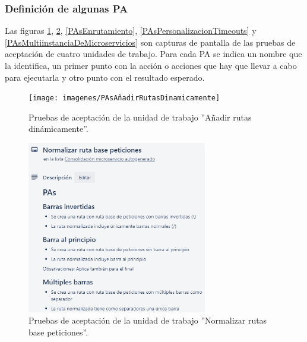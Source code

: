 \documentclass[11pt,spanish,listoffigures]{tfgetsinf}
\begin{document}

			\subsubsection{Definición de algunas PA}

Las figuras \ref{PAsAñadirRutasDinamicamente}, \ref{PAsNormalizarRutaBasePeticiones}, \ref{PAsEnrutamiento}, \ref{PAsPersonalizacionTimeouts} y \ref{PAsMultiinstanciaDeMicroservicios} son capturas de pantalla de las pruebas de aceptación de cuatro unidades de trabajo. Para cada PA se indica un nombre que la identifica, un primer punto con la acción o acciones que hay que llevar a cabo para ejecutarla y otro punto con el resultado esperado.

\begin{figure}[H] %
\centering
\texttt{[image: imagenes/PAsAñadirRutasDinamicamente]}
\caption{Pruebas de aceptación de la unidad de trabajo ''Añadir rutas dinámicamente''.}
	\label{PAsAñadirRutasDinamicamente}
\end{figure}

\begin{figure}[H] %
\centering
\includegraphics[width=0.7\textwidth]{imagenes/PAsNormalizarRutaBasePeticiones}
\caption{Pruebas de aceptación de la unidad de trabajo ''Normalizar rutas base peticiones''.}
	\label{PAsNormalizarRutaBasePeticiones}
\end{figure}
\end{document}
